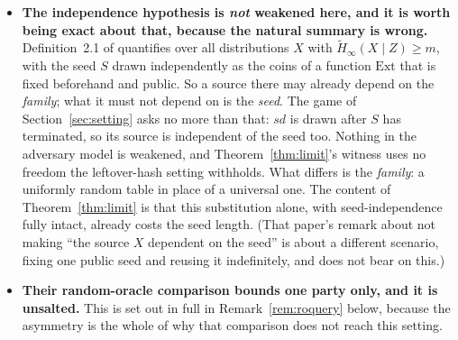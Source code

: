 \documentclass{aicr-solution}
\newcommand{\sd}{\mathit{sd}}
\begin{document}
\begin{itemize}
\item \textbf{The independence hypothesis is \emph{not} weakened here, and it is worth being exact
about that, because the natural summary is wrong.} Definition~2.1 of \cite{BDKPPSY11} quantifies
over all distributions $X$ with $\tilde H_\infty(X \mid Z) \ge m$, with the seed $S$ drawn
independently as the coins of a function $\mathrm{Ext}$ that is fixed beforehand and public. So a
source there may already depend on the \emph{family}; what it must not depend on is the
\emph{seed}. The game of Section~\ref{sec:setting} asks no more than that: $\sd$ is drawn after $S$ has
terminated, so its source is independent of the seed too. Nothing in the adversary model is
weakened, and Theorem~\ref{thm:limit}'s witness uses no freedom the leftover-hash setting withholds.
What differs is the \emph{family}: a uniformly random table in place of a universal one. The
content of Theorem~\ref{thm:limit} is that this substitution alone, with seed-independence fully
intact, already costs the seed length. (That paper's remark about not making ``the source $X$
dependent on the seed'' is about a different scenario, fixing one public seed and reusing it
indefinitely, and does not bear on this.)

\item \textbf{Their random-oracle comparison bounds one party only, and it is unsalted.} This is
set out in full in Remark~\ref{rem:roquery} below, because the asymmetry is the whole of why that
comparison does not reach this setting.
\end{itemize}
\end{document}
